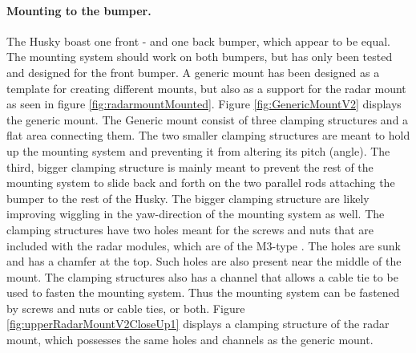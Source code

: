\paragraph{Mounting to the bumper.}
The Husky boast one front - and one back bumper, which appear to be equal. The mounting system should work on both bumpers, but has only been tested and designed for the front bumper. A generic mount has been designed as a template for creating different mounts, but also as a support for the radar mount as seen in figure \ref{fig:radarmountMounted}. Figure \ref{fig:GenericMountV2} displays the generic mount. The Generic mount consist of three clamping structures and a flat area connecting them. The two smaller clamping structures are meant to hold up the mounting system and preventing it from altering its pitch (angle). The third, bigger clamping structure is mainly meant to prevent the rest of the mounting system to slide back and forth on the two parallel rods attaching the bumper to the rest of the Husky. The bigger clamping structure are likely improving wiggling in the yaw-direction of the mounting system as well. The clamping structures have two holes meant for the screws and nuts that are included with the radar modules, which are of the M3-type \cite{awr1843boostintro}. The holes are sunk and has a chamfer at the top. Such holes are also present near the middle of the mount. The clamping structures also has a channel that allows a cable tie to be used to fasten the mounting system. Thus the mounting system can be fastened by screws and nuts or cable ties, or both. Figure \ref{fig:upperRadarMountV2CloseUp1} displays a clamping structure of the radar mount, which possesses the same holes and channels as the generic mount.

